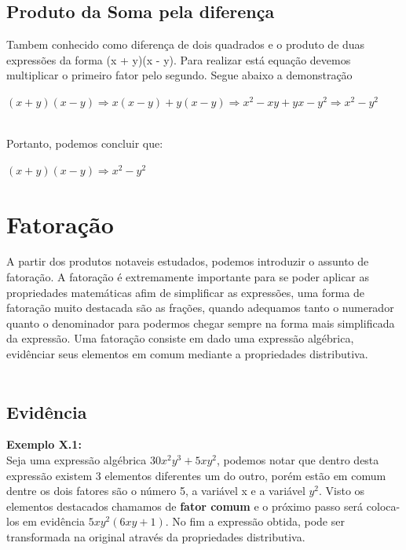 \documentclass[a4paper,12pt,twoside,BCOR=10mm]{scrbook}
\begin{document}
\begin{titlepage}
\subsection{Produto da Soma pela diferença}
Tambem conhecido como diferença de dois quadrados e o produto de duas expressões da forma (x + y)(x - y). Para realizar está equação devemos multiplicar o primeiro fator pelo segundo. Segue abaixo a demonstração
\\
\begin{center}
$(x + y)(x - y) \Rightarrow x(x - y) + y(x - y) \Rightarrow x^{2} - xy + yx - y^{2} \Rightarrow x^{2} - y^{2}$
\end{center}
\\
Portanto, podemos concluir que:
\\
\begin{center}
$(x + y)(x - y) \Rightarrow x^{2} - y^{2}$
\end{center}

\section{Fatoração}
A partir dos produtos notaveis estudados, podemos introduzir o assunto de fatoração. A fatoração é extremamente importante para se poder aplicar as propriedades matemáticas afim de simplificar as expressões, uma forma de fatoração muito destacada são as frações, quando adequamos tanto o numerador quanto o denominador para podermos chegar sempre na forma mais simplificada da expressão. Uma fatoração consiste em dado uma expressão algébrica, evidênciar seus elementos em comum mediante a propriedades distributiva. 
\\
\\
\subsection{Evidência}
\textbf{Exemplo X.1:}
\\
Seja uma expressão algébrica $30x^{2}y^{3} + 5xy^{2}$, podemos notar que dentro desta expressão existem 3 elementos diferentes um do outro, porém estão em comum dentre os dois fatores são o número 5, a variável x e a variável $y^{2}$. Visto os elementos destacados chamamos de \textbf{fator comum} e o próximo passo será coloca-los em evidência $5xy^{2}(6xy + 1)$. No fim a expressão obtida, pode ser transformada na original através da propriedades distributiva.\\
\\

\end{titlepage}
\end{document}
